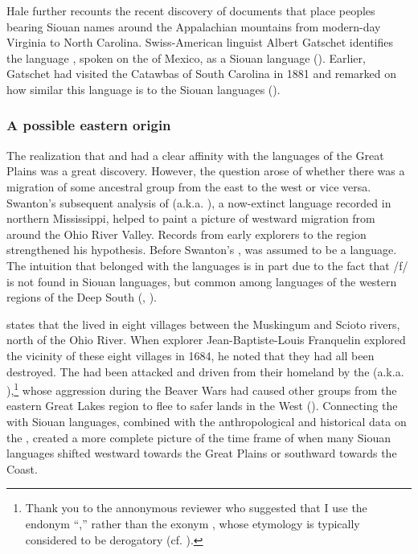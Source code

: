 \documentclass[output=paper]{LSP/langsci}
\begin{document}
Hale further recounts the recent discovery of documents that place peoples bearing Siouan names around the Appalachian mountains from modern-day Virginia to North Carolina. Swiss-American linguist Albert Gatschet identifies the language , spoken on the  of Mexico, as a Siouan language (\citealt{Dorsey1893}). Earlier, Gatschet had visited the Catawbas of South Carolina in 1881 and remarked on how similar this language is to the Siouan languages (\citealt{Gatschet1900}). 

\subsubsection{A possible eastern origin} The realization that  and  had a clear affinity with the  languages of the Great Plains was a great discovery. However, the question arose of whether there was a migration of some ancestral group from the east to the west or vice versa. Swanton's \citeyear{Swanton1909} subsequent analysis of  (a.k.a. ), a now-extinct language recorded in northern Mississippi, helped to paint a picture of westward migration from around the Ohio River Valley. Records from early explorers to the region strengthened his hypothesis. Before Swanton's ,  was assumed to be a  language. The intuition that  belonged with the  languages is in part due to the fact that /f/ is not found in Siouan languages, but common among languages of the western regions of the Deep South (\citealt{Rankin2004ofo}, \citealt{Kaufman2014}). 

\citet{Hanna1911} states that the  lived in eight villages between the Muskingum and Scioto rivers, north of the Ohio River. When  explorer Jean-Baptiste-Louis Franquelin explored the vicinity of these eight villages in 1684, he noted that they had all been destroyed. The  had been attacked and driven from their homeland by the  (a.k.a. ),\footnote{Thank you to the annonymous reviewer who suggested that I use the endonym ``,'' rather than the exonym , whose etymology is typically considered to be derogatory (cf. \citealt{Day1968}).} whose aggression during the Beaver Wars had caused other groups from the eastern Great Lakes region to flee to safer lands in the West (\citealt{Swanton1952}). Connecting the  with Siouan languages, combined with the anthropological and historical data on the , created a more complete picture of the time frame of when many Siouan languages shifted westward towards the Great Plains or southward towards the  Coast. 
\end{document}
